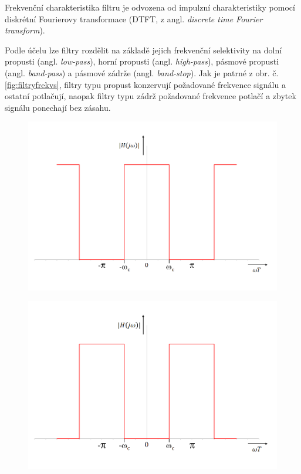 \documentclass[a4paper, 12pt]{article}
\begin{document}
\noindent Frekvenční charakteristika filtru je odvozena od impulzní charakteristiky pomocí diskrétní Fourierovy transformace (DTFT, z angl. \textit{discrete time Fourier transform}).

Podle účelu lze filtry rozdělit na základě jejich frekvenční selektivity na dolní propusti (angl. \textit{low-pass}), horní propusti (angl. \textit{high-pass}), pásmové propusti (angl. \textit{band-pass}) a pásmové zádrže (angl. \textit{band-stop}). Jak je patrné z obr. č.\ref{fig:filtryfrekvs}, filtry typu propust konzervují požadované frekvence signálu a ostatní potlačují, naopak filtry typu zádrž požadované frekvence potlačí a zbytek signálu ponechají bez zásahu.

\begin{figure}[hbt!]
\centering
\begin{minipage}[b]{6.5cm}
  \centering
  \includegraphics[width=\linewidth]{lowpass.png}\\
\end{minipage}\hspace{0.5cm}
\begin{minipage}[b]{6.5cm}
  \centering
  \includegraphics[width=\linewidth]{highpass.png}\\

\end{minipage}
\end{figure}
\end{document}
